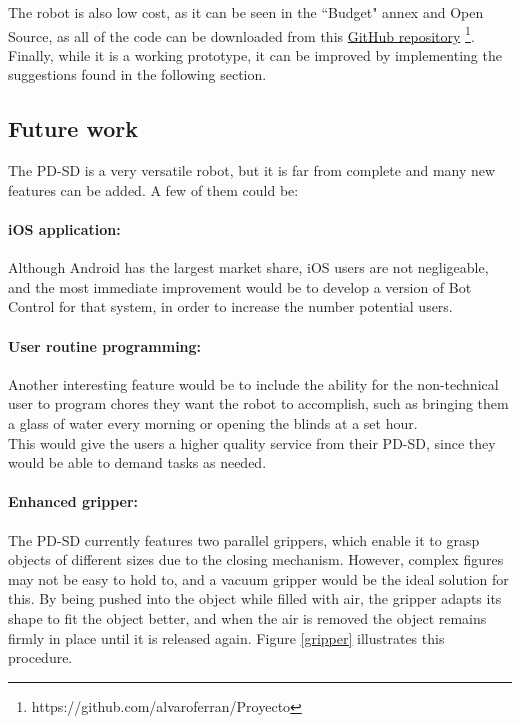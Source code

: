 The robot is also low cost, as it can be seen in the ``Budget" annex and Open Source, as all of the code can be downloaded from this \href{https://github.com/alvaroferran/Proyecto}{GitHub repository} \footnote{https://github.com/alvaroferran/Proyecto}.\\

Finally, while it is a working prototype, it can be improved by implementing the suggestions found in the following section.





















\newpage
\subsection{Future work}

The PD-SD is a very versatile robot, but it is far from complete and many new features can be added. A few of them could be:

\paragraph{iOS application:} Although Android has the largest market share, iOS users are not negligeable, and the most immediate improvement would be to develop a version of Bot Control for that system, in order to increase the number potential users.

\paragraph{User routine programming:} Another interesting feature would be to include the ability for the non-technical user to program chores they want the robot to accomplish, such as bringing them a glass of water every morning or opening the blinds at a set hour. \\

This would give the users a higher quality service from their PD-SD, since they would be able to demand tasks as needed.



\paragraph{Enhanced gripper:}  The PD-SD currently features two parallel grippers, which enable it to grasp objects of different sizes due to the closing mechanism. However, complex figures may not be easy to hold to, and a vacuum gripper would be the ideal solution for this. By being pushed into the object while filled with air, the gripper adapts its shape to fit the object better, and when the air is removed the object remains firmly in place until it is released again. Figure \ref{gripper} illustrates this procedure.

